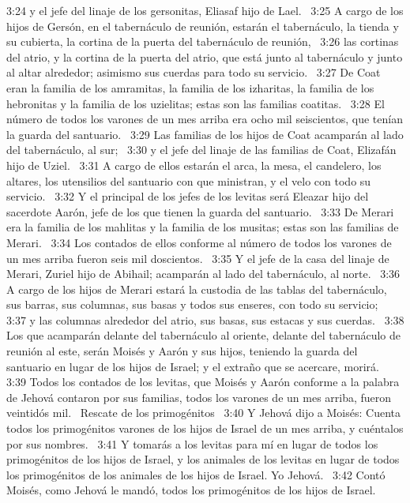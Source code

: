 3:24 y el jefe del linaje de los gersonitas, Eliasaf hijo de Lael.  
3:25 A cargo de los hijos de Gersón, en el tabernáculo de reunión, estarán el tabernáculo, la tienda y su cubierta, la cortina de la puerta del tabernáculo de reunión,  
3:26 las cortinas del atrio, y la cortina de la puerta del atrio, que está junto al tabernáculo y junto al altar alrededor; asimismo sus cuerdas para todo su servicio.  
3:27 De Coat eran la familia de los amramitas, la familia de los izharitas, la familia de los hebronitas y la familia de los uzielitas; estas son las familias coatitas.  
3:28 El número de todos los varones de un mes arriba era ocho mil seiscientos, que tenían la guarda del santuario.  
3:29 Las familias de los hijos de Coat acamparán al lado del tabernáculo, al sur;  
3:30 y el jefe del linaje de las familias de Coat, Elizafán hijo de Uziel.  
3:31 A cargo de ellos estarán el arca, la mesa, el candelero, los altares, los utensilios del santuario con que ministran, y el velo con todo su servicio.  
3:32 Y el principal de los jefes de los levitas será Eleazar hijo del sacerdote Aarón, jefe de los que tienen la guarda del santuario.  
3:33 De Merari era la familia de los mahlitas y la familia de los musitas; estas son las familias de Merari.  
3:34 Los contados de ellos conforme al número de todos los varones de un mes arriba fueron seis mil doscientos.  
3:35 Y el jefe de la casa del linaje de Merari, Zuriel hijo de Abihail; acamparán al lado del tabernáculo, al norte.  
3:36 A cargo de los hijos de Merari estará la custodia de las tablas del tabernáculo, sus barras, sus columnas, sus basas y todos sus enseres, con todo su servicio;  
3:37 y las columnas alrededor del atrio, sus basas, sus estacas y sus cuerdas.  
3:38 Los que acamparán delante del tabernáculo al oriente, delante del tabernáculo de reunión al este, serán Moisés y Aarón y sus hijos, teniendo la guarda del santuario en lugar de los hijos de Israel; y el extraño que se acercare, morirá.  
3:39 Todos los contados de los levitas, que Moisés y Aarón conforme a la palabra de Jehová contaron por sus familias, todos los varones de un mes arriba, fueron veintidós mil.  
Rescate de los primogénitos  
3:40 Y Jehová dijo a Moisés: Cuenta todos los primogénitos varones de los hijos de Israel de un mes arriba, y cuéntalos por sus nombres.  
3:41 Y tomarás a los levitas para mí en lugar de todos los primogénitos de los hijos de Israel, y los animales de los levitas en lugar de todos los primogénitos de los animales de los hijos de Israel. Yo Jehová.  
3:42 Contó Moisés, como Jehová le mandó, todos los primogénitos de los hijos de Israel.  
